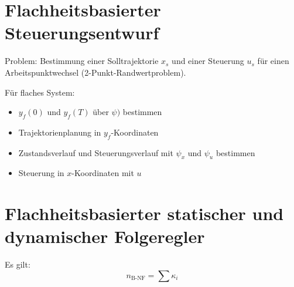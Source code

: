 \section{Flachheitsbasierter Steuerungsentwurf}
Problem: Bestimmung einer Solltrajektorie $x_s$ und einer Steuerung $u_s$ für einen
Arbeitspunktwechsel (2-Punkt-Randwertproblem).

Für flaches System:
\begin{itemize}
    \item $y_f(0)$ und $y_f(T)$ über $\psi)$ bestimmen
    \item Trajektorienplanung in $y_f$-Koordinaten
    \item Zustandsverlauf und Steuerungsverlauf mit $\psi_x$ und $\psi_u$ bestimmen
    \item Steuerung in $x$-Koordinaten mit $u$
\end{itemize}

\section{Flachheitsbasierter statischer und dynamischer Folgeregler}
Es gilt:
\begin{equation}
    n_\text{B-NF} = \sum \kappa_i
\end{equation}

